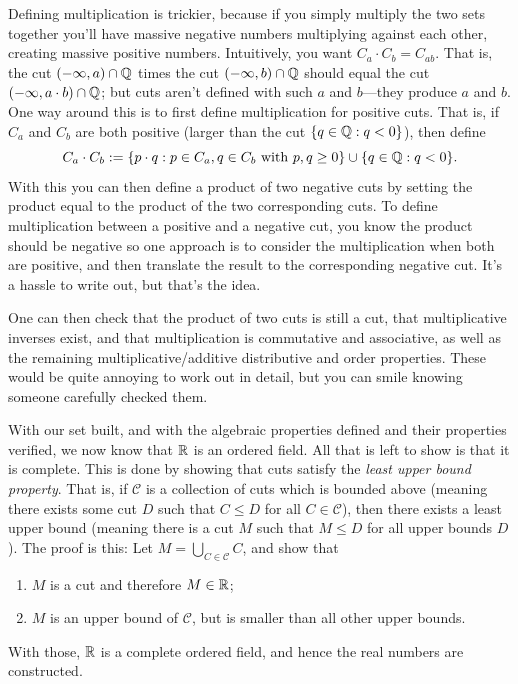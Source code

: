 \begin{proofsketch}
  Defining multiplication is trickier, because if you simply multiply
  the two sets together you'll have massive negative numbers
  multiplying against each other, creating massive positive numbers.
  Intuitively, you want $C_a \cdot C_b = C_{ab}$. That is, the cut
  $(-\infty, a) \cap \mathbb Q$ times the cut $(-\infty, b) \cap \mathbb Q$
  should equal the cut $(-\infty, a \cdot b) \cap \mathbb Q$; but cuts
  aren't defined with such $a$ and $b$—they produce $a$ and $b$. One
  way around this is to first define multiplication for positive
  cuts. That is, if $C_a$ and $C_b$ are both positive (larger than
  the cut $\{ q \in \mathbb Q : q < 0 \}$), then define
  \[ C_a \cdot C_b := \{ p \cdot q : p \in C_a, q \in C_b \text{
  with } p, q \geq 0 \} \cup \{ q \in \mathbb Q : q < 0 \}. \]
  With this you can then define a product of two negative cuts by
  setting the product equal to the product of the two corresponding
  cuts. To define multiplication between a positive and a negative
  cut, you know the product should be negative so one approach is to
  consider the multiplication when both are positive, and then
  translate the result to the corresponding negative cut. It's a
  hassle to write out, but that's the idea.

  One can then check that the product of two cuts is still a cut,
  that multiplicative inverses exist, and that multiplication is
  commutative and associative, as well as the remaining
  multiplicative/additive distributive and order properties. These
  would be quite annoying to work out in detail, but you can smile
  knowing someone carefully checked them.

  With our set built, and with the algebraic properties defined and
  their properties verified, we now know that $\mathbb R$ is an ordered
  field. All that is left to show is that it is complete. This is
  done by showing that cuts satisfy the \textit{least upper bound
  property}. That is, if $\mathcal{C}$ is a collection of cuts which
  is bounded above (meaning there exists some cut $D$ such that $C
  \leq D$ for all $C \in \mathcal{C}$), then there exists a least
  upper bound (meaning there is a cut $M$ such that $M \leq D$ for
  all upper bounds $D$). The proof is this: Let $M = \bigcup_{C \in
  \mathcal{C}} C$, and show that
  \begin{enumerate}
    \item $M$ is a cut and therefore $M \in \mathbb R$;
    \item $M$ is an upper bound of $\mathcal{C}$, but is smaller than
      all other upper bounds.
  \end{enumerate}
  With those, $\mathbb R$ is a complete ordered field, and hence the real
  numbers are constructed.
\end{proofsketch}

